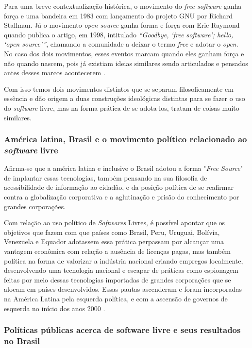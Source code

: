 \documentclass[12pt]{article}
\begin{document}
Para uma breve contextualização histórica, o movimento do \textit{free software} ganha força e uma bandeira em 1983 com lançamento do projeto GNU por Richard Stallman. Já o movimento \textit{open source} ganha forma e força com Eric Raymond quando publica o artigo, em 1998, intitulado \textit{“Goodbye, ‘free software’; hello, ‘open source’”}, chamando a comunidade a deixar o termo \textit{free} e adotar o \textit{open}. No caso dos dois movimentos, esses eventos marcam quando eles ganham força e não quando nascem, pois já existiam ideias similares sendo articulados e pensados antes desses marcos acontecerem \cite{evangelista2014movimento}.

Com isso temos dois movimentos distintos que se separam filosoficamente em essência e dão origem a duas construções ideológicas distintas para se fazer o uso do \textit{software} livre, mas na forma prática de se adota-los, tratam de coisas muito similares\cite{torres2018software}.

\subsubsection{América latina, Brasil e o movimento político relacionado ao \textit{software} livre}
Afirma-se que a américa latina e inclusive o Brasil adotou a forma "\textit{Free Source}" de implantar essas tecnologias, também pensando na sua filosofia de acessibilidade de informação ao cidadão, e da posição política de se reafirmar contra a globalização corporativa e a aglutinação e prisão do conhecimento por grandes corporações\cite{torres2018software}.

Com relação ao uso político de \textit{Softwares} Livres, é possível apontar que os objetivos que fazem com que países como Brasil, Peru, Uruguai, Bolívia, Venezuela e Equador adotassem essa prática perpassam por alcançar uma vantagem econômica com relação a ausência de licenças pagas, mas também política na forma de valorizar a indústria nacional criando empregos localmente, desenvolvendo uma tecnologia nacional e escapar de práticas como espionagem feitas por meio dessas tecnologias importadas de grandes corporações que se alocam em países desenvolvidos. Essas pautas ascenderam e foram incorporadas na América Latina pela esquerda política, e com a ascensão de governos de esquerda no início dos anos 2000 \cite{torres2018software}.

\subsubsection{Políticas públicas acerca de software livre e seus resultados no Brasil }
\end{document}
